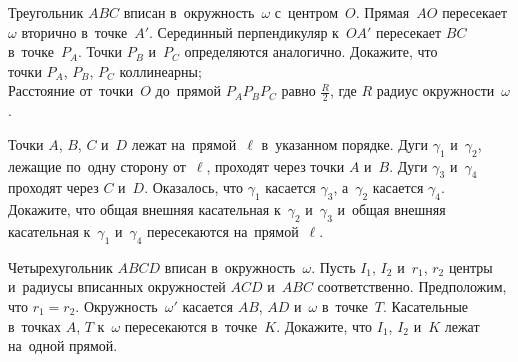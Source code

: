 \begin{problems}
\item
Треугольник $ABC$ вписан в~окружность~$\omega$ с~центром~$O$.
Прямая~$AO$ пересекает $\omega$ вторично в~точке~$A'$.
Серединный перпендикуляр к~$OA'$ пересекает $BC$ в~точке~$P_{A}$.
Точки $P_{B}$ и~$P_{C}$ определяются аналогично.
Докажите, что
\\
\subproblem
точки $P_{A}$, $P_{B}$, $P_{C}$ коллинеарны;
\\
\subproblem
Расстояние от~точки~$O$ до~прямой $P_{A}P_{B}P_{C}$ равно $\frac{R}{2}$, где
$R$ радиус окружности~$\omega$.

\item
Точки $A$, $B$, $C$ и~$D$ лежат на~прямой~$\ell$ в~указанном порядке.
Дуги $\gamma_{1}$ и~$\gamma_{2}$, лежащие по~одну сторону от~$\ell$, проходят
через точки $A$ и~$B$.
Дуги $\gamma_{3}$ и~$\gamma_{4}$ проходят через $C$ и~$D$.
Оказалось, что $\gamma_{1}$ касается $\gamma_{3}$, а~$\gamma_{2}$ касается
$\gamma_{4}$.
Докажите, что общая внешняя касательная к~$\gamma_{2}$ и~$\gamma_{3}$ и~общая
внешняя касательная к~$\gamma_{1}$ и~$\gamma_{4}$ пересекаются
на~прямой~$\ell$.

\item
Четырехугольник $ABCD$ вписан в~окружность~$\omega$.
Пусть $I_{1}$, $I_{2}$ и~$r_{1}$, $r_{2}$ центры и~радиусы вписанных
окружностей $ACD$ и~$ABC$ соответственно.
Предположим, что $r_{1} = r_{2}$.
Окружность~$\omega'$ касается $AB$, $AD$ и~$\omega$ в~точке~$T$.
Касательные в~точках $A$, $T$ к~$\omega$ пересекаются в~точке~$K$.
Докажите, что $I_{1}$, $I_{2}$ и~$K$ лежат на~одной прямой.

\end{problems}


